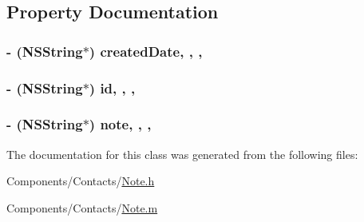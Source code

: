 \subsection{Property Documentation}
\hypertarget{interface_note_ac7abb36a7f71efef1ea545064af3aa86}{
\subsubsection[{created\-Date}]{\setlength{\rightskip}{0pt plus 5cm}-\/ (N\-S\-String$\ast$) created\-Date\hspace{0.3cm}{\ttfamily [read]}, {\ttfamily [write]}, {\ttfamily [nonatomic]}, {\ttfamily [strong]}}}\label{interface_note_ac7abb36a7f71efef1ea545064af3aa86}
\hypertarget{interface_note_ad060a0b99312b140563b7b065cf51101}{
\subsubsection[{id}]{\setlength{\rightskip}{0pt plus 5cm}-\/ (N\-S\-String$\ast$) id\hspace{0.3cm}{\ttfamily [read]}, {\ttfamily [write]}, {\ttfamily [nonatomic]}, {\ttfamily [assign]}}}\label{interface_note_ad060a0b99312b140563b7b065cf51101}
\hypertarget{interface_note_a4a5a0e45c35c48be062f46f578077ea7}{
\subsubsection[{note}]{\setlength{\rightskip}{0pt plus 5cm}-\/ (N\-S\-String$\ast$) note\hspace{0.3cm}{\ttfamily [read]}, {\ttfamily [write]}, {\ttfamily [nonatomic]}, {\ttfamily [strong]}}}\label{interface_note_a4a5a0e45c35c48be062f46f578077ea7}


The documentation for this class was generated from the following files\-:\begin{DoxyCompactItemize}
\item 
Components/\-Contacts/\hyperlink{_note_8h}{Note.\-h}\item 
Components/\-Contacts/\hyperlink{_note_8m}{Note.\-m}\end{DoxyCompactItemize}
